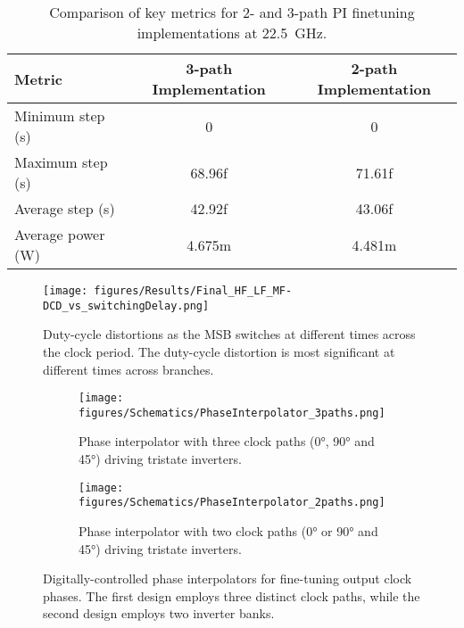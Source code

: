 


\begin{table}[h]
\centering
\caption{Comparison of key metrics for 2- and 3-path PI finetuning implementations at 22.5~GHz.}
\begin{tabular}{|l|c|c|}
\hline
\textbf{Metric} & \textbf{3-path Implementation} & \textbf{2-path Implementation} \\
\hline
Minimum step (s) & 0 & 0 \\
Maximum step (s) & 68.96f & 71.61f \\
Average step (s) & 42.92f & 43.06f \\
Average power (W) & 4.675m & 4.481m \\
\hline
\end{tabular}
\label{tab:phase_interpolator_metrics}
\end{table}


\begin{figure}[H]
  \centering
  \texttt{[image: figures/Results/Final\_HF\_LF\_MF-DCD\_vs\_switchingDelay.png]}
  \caption{Duty-cycle distortions as the MSB switches at different times across the clock period. The duty-cycle distortion is most significant at different times across branches.}
  \label{fig:dcd_MSB}
\end{figure}

\begin{figure}[H]
  \centering
  \hfill
  \begin{subfigure}[t]{0.3\linewidth}
    \centering
    \texttt{[image: figures/Schematics/PhaseInterpolator\_3paths.png]}
    \caption{Phase interpolator with three clock paths (\ang{0}, \ang{90} and \ang{45}) driving tristate inverters.}
    \label{fig:phase_interpolator_3paths}
  \end{subfigure}%
  \hfill
  \begin{subfigure}[t]{0.3\linewidth}
    \centering
    \texttt{[image: figures/Schematics/PhaseInterpolator\_2paths.png]}
    \caption{Phase interpolator with two clock paths (\ang{0} or \ang{90} and \ang{45}) driving tristate inverters.}
    \label{fig:phase_interpolator_2paths}
  \end{subfigure}
  \hfill\null
  \caption{Digitally-controlled phase interpolators for fine-tuning output clock phases. The first design employs three distinct clock paths, while the second design employs two inverter banks.}
  \label{fig:phase_interpolators}
\end{figure}


